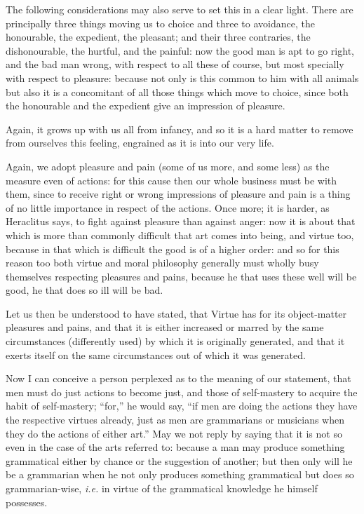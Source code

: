 The following considerations may also serve to set this in a clear light. There
are principally three things moving us to choice and three to avoidance, the
honourable, the expedient, the pleasant; and their three contraries, the
dishonourable, the hurtful, and the painful: now the good man is apt to go
right, and the bad man wrong, with respect to all these of course, but most
specially with respect to pleasure: because not only is this common to him with
all animals but also it is a concomitant of all those things which move to
choice, since both the honourable and the expedient give an impression of
pleasure.

Again, it grows up with us all from infancy, and so it is a hard matter to
remove from ourselves this feeling, engrained as it is into our very life.

Again, we adopt pleasure and pain (some of us more, and some less) as the
measure even of actions: for this cause then our whole business must be with
them, since to receive right or wrong impressions of pleasure and pain is a
thing of no little importance in respect of the actions. Once more; it is
harder, as Heraclitus says, to fight against pleasure than against anger: now
it is about that which is more than commonly difficult that art comes into
being, and virtue too, because in that which is difficult the good is of a
higher order: and so for this reason too both virtue and moral philosophy
generally must wholly busy themselves respecting pleasures and pains, because
he that uses these well will be good, he that does so ill will be bad.

Let us then be understood to have stated, that Virtue has for its object-matter
pleasures and pains, and that it is either increased or marred by the same
circumstances (differently used) by which it is originally generated, and that
it exerts itself on the same circumstances out of which it was generated.


Now I can conceive a person perplexed as to the meaning of our statement, that
men must do just actions to become just, and those of self-mastery to acquire
the habit of self-mastery; “for,” he would say, “if men are
doing the actions they have the respective virtues already, just as men are
grammarians or musicians when they do the actions of either art.” May we
not reply by saying that it is not so even in the case of the arts referred to:
because a man may produce something grammatical either by chance or the
suggestion of another; but then only will he be a grammarian when he not only
produces something grammatical but does so grammarian-wise, \emph{i.e.} in
virtue of the grammatical knowledge he himself possesses.

